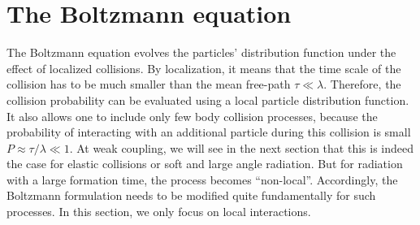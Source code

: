 \section{The Boltzmann equation}
The Boltzmann equation evolves the particles' distribution function under the effect of localized collisions. 
By localization, it means that the time scale of the collision has to be much smaller than the mean free-path $\tau \ll \lambda$. 
Therefore, the collision probability can be evaluated using a local particle distribution function.
It also allows one to include only few body collision processes, because the probability of interacting with an additional particle during this collision is small $P \approx \tau/\lambda \ll 1$.
At weak coupling, we will see in the next section that this is indeed the case for elastic collisions or soft and large angle radiation. 
But for radiation with a large formation time, the process becomes ``non-local''.
Accordingly, the Boltzmann formulation needs to be modified quite fundamentally for such processes.
In this section, we only focus on local interactions.

